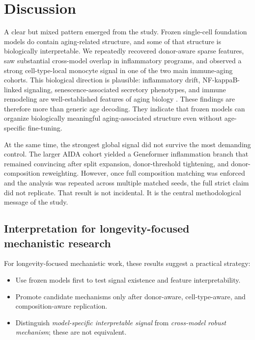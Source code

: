 \documentclass[11pt]{article}
\begin{document}
\section{Discussion}
A clear but mixed pattern emerged from the study. Frozen single-cell foundation models do contain aging-related structure, and some of that structure is biologically interpretable. We repeatedly recovered donor-aware sparse features, saw substantial cross-model overlap in inflammatory programs, and observed a strong cell-type-local monocyte signal in one of the two main immune-aging cohorts. This biological direction is plausible: inflammatory drift, NF-kappaB-linked signaling, senescence-associated secretory phenotypes, and immune remodeling are well-established features of aging biology \citep{franceschi2000inflammaging,furman2019chronic,ferrucci2018inflammageing,goronzy2019tcell,salminen2008nfkb,chien2011sasp,basisty2020secretome}. These findings are therefore more than generic age decoding. They indicate that frozen models can organize biologically meaningful aging-associated structure even without age-specific fine-tuning.

At the same time, the strongest global signal did not survive the most demanding control. The larger AIDA cohort yielded a Geneformer inflammation branch that remained convincing after split expansion, donor-threshold tightening, and donor-composition reweighting. However, once full composition matching was enforced and the analysis was repeated across multiple matched seeds, the full strict claim did not replicate. That result is not incidental. It is the central methodological message of the study.

\subsection{Interpretation for longevity-focused mechanistic research}
For longevity-focused mechanistic work, these results suggest a practical strategy:
\begin{itemize}
  \item Use frozen models first to test signal existence and feature interpretability.
  \item Promote candidate mechanisms only after donor-aware, cell-type-aware, and composition-aware replication.
  \item Distinguish \emph{model-specific interpretable signal} from \emph{cross-model robust mechanism}; these are not equivalent.
\end{itemize}
\end{document}
